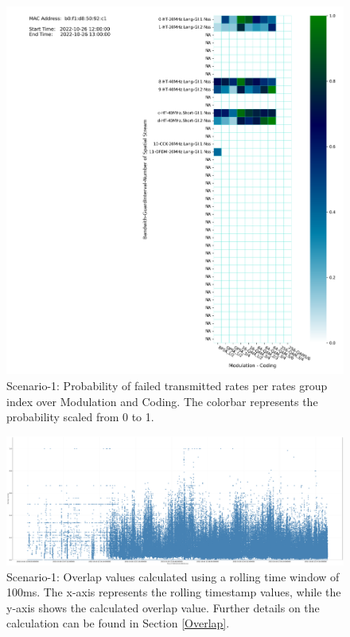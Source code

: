 \begin{figure}[hbt!]
  \centering
  \includegraphics[width=\textwidth]{figures/plots/Scenario-1/G1-coldmap-p-b0:f1:d8:50:92:c1-22-1652-351697.png}
  \caption[Rate-Based Transmission Failure Analysis]{Scenario-1: Probability of failed transmitted rates per rates group index over Modulation and Coding. The colorbar represents the probability scaled from 0 to 1.}
  \label{fig:Fail-probability1}
\end{figure}
\FloatBarrier 

\begin{landscape}
\begin{figure}[hbt!]
  \centering
  \includegraphics[width=1.45\textwidth, height=\textheight, keepaspectratio]{figures/plots/Scenario-1/G1-overlap-b0:f1:d8:50:92:c1-22-1652-351697-100ms.png}
  \caption[Overlap of Packet Success \& Failure with Rolling Time Average]{Scenario-1: Overlap values calculated using a rolling time window of 100ms. The x-axis represents the rolling timestamp values, while the y-axis shows the calculated overlap value. Further details on the calculation can be found in Section \ref{Overlap}.}
  \label{fig:overlap1}
\end{figure}
\FloatBarrier  
\end{landscape}

